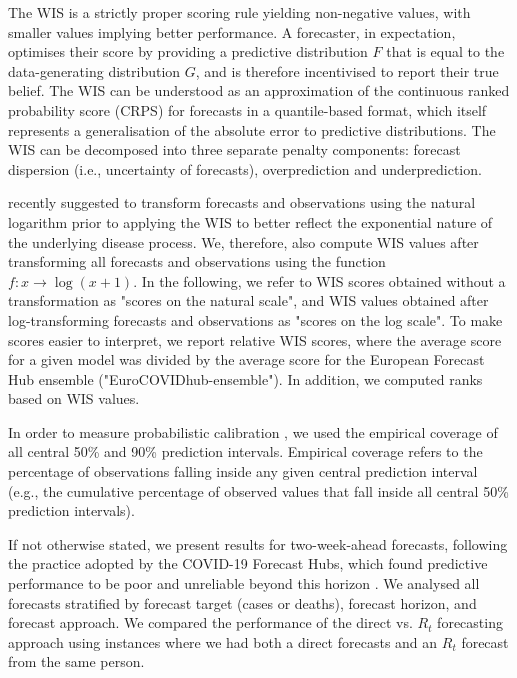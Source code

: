 \documentclass[10pt,a4paper,twocolumn]{article}
\begin{document}
The WIS is a strictly proper scoring rule yielding non-negative values, with smaller values implying better performance. A forecaster, in expectation, optimises their score by providing a predictive distribution $F$ that is equal to the data-generating distribution $G$, and is therefore incentivised to report their true belief. The WIS can be understood as an approximation of the continuous ranked probability score (CRPS) for forecasts in a quantile-based format, which itself represents a generalisation of the absolute error to predictive distributions. The WIS can be decomposed into three separate penalty components: forecast dispersion (i.e., uncertainty of forecasts), overprediction and underprediction. 

\citet{bosseTransformationForecastsEvaluating2023} recently suggested to transform forecasts and observations using the natural logarithm prior to applying the WIS to better reflect the exponential nature of the underlying disease process. We, therefore, also compute WIS values after transforming all forecasts and observations using the function $f\colon x \to \log (x + 1)$. In the following, we refer to WIS scores obtained without a transformation as "scores on the natural scale", and WIS values obtained after log-transforming forecasts and observations as "scores on the log scale". To make scores easier to interpret, we report relative WIS scores, where the average score for a given model was divided by the average score for the European Forecast Hub ensemble ("EuroCOVIDhub-ensemble"). In addition, we computed ranks based on WIS values. 

In order to measure probabilistic calibration \citep{gneitingProbabilisticForecastsCalibration2007}, we used the empirical coverage of all central 50\% and 90\% prediction intervals. Empirical coverage refers to the percentage of observations falling inside any given central prediction interval (e.g., the cumulative percentage of observed values that fall inside all central 50\% prediction intervals). 

If not otherwise stated, we present results for two-week-ahead forecasts, following the practice adopted by the COVID-19 Forecast Hubs, which found predictive performance to be poor and unreliable beyond this horizon \cite{cramerEvaluationIndividualEnsemble2021, sherrattPredictivePerformanceMultimodel2022, bracherShorttermForecastingCOVID192021}. We analysed all forecasts stratified by forecast target (cases or deaths), forecast horizon, and forecast approach. We compared the performance of the direct vs. $R_t$ forecasting approach using instances where we had both a direct forecasts and an $R_t$ forecast from the same person. 
\end{document}
